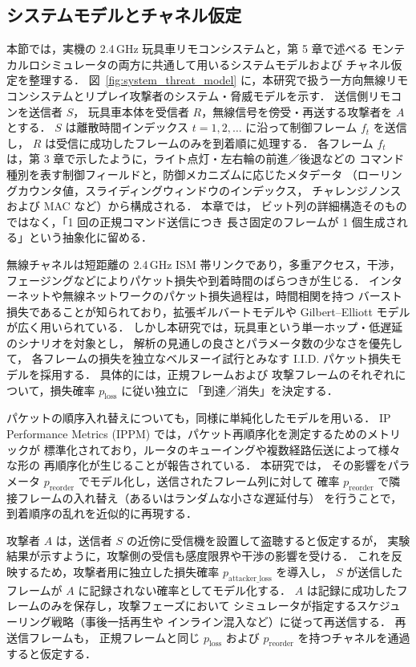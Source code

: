 \documentclass[twocolumn,10pt,a4paper]{jsarticle}
\begin{document}
\subsection{システムモデルとチャネル仮定}

本節では，実機の 2.4\,GHz 玩具車リモコンシステムと，第 5 章で述べる
モンテカルロシミュレータの両方に共通して用いるシステムモデルおよび
チャネル仮定を整理する．
図~\ref{fig:system_threat_model} に，本研究で扱う一方向無線リモコンシステムとリプレイ攻撃者のシステム・脅威モデルを示す．
送信側リモコンを送信者 $S$，
玩具車本体を受信者 $R$，無線信号を傍受・再送する攻撃者を $A$ とする．
$S$ は離散時間インデックス $t = 1,2,\ldots$ に沿って制御フレーム $f_t$ を送信し，
$R$ は受信に成功したフレームのみを到着順に処理する．
各フレーム $f_t$ は，第 3 章で示したように，ライト点灯・左右輪の前進／後退などの
コマンド種別を表す制御フィールドと，防御メカニズムに応じたメタデータ
（ローリングカウンタ値，スライディングウィンドウのインデックス，
チャレンジノンスおよび MAC など）から構成される．
本章では，
ビット列の詳細構造そのものではなく，「1 回の正規コマンド送信につき
長さ固定のフレームが 1 個生成される」という抽象化に留める．

無線チャネルは短距離の 2.4\,GHz ISM 帯リンクであり，多重アクセス，干渉，
フェージングなどによりパケット損失や到着時間のばらつきが生じる．
インターネットや無線ネットワークのパケット損失過程は，時間相関を持つ
バースト損失であることが知られており，拡張ギルバートモデルや
Gilbert--Elliott モデルが広く用いられている\cite{Jiang2000Modeling,Hasslinger2008GE}．
しかし本研究では，玩具車という単一ホップ・低遅延のシナリオを対象とし，
解析の見通しの良さとパラメータ数の少なさを優先して，
各フレームの損失を独立なベルヌーイ試行とみなす
I.I.D. パケット損失モデルを採用する．
具体的には，正規フレームおよび
攻撃フレームのそれぞれについて，損失確率 $p_{\mathrm{loss}}$ に従い独立に
「到達／消失」を決定する．

パケットの順序入れ替えについても，同様に単純化したモデルを用いる．
IP Performance Metrics (IPPM) では，パケット再順序化を測定するためのメトリックが
標準化されており，ルータのキューイングや複数経路伝送によって様々な形の
再順序化が生じることが報告されている\cite{rfc4737}．
本研究では，
その影響をパラメータ $p_{\mathrm{reorder}}$ でモデル化し，送信されたフレーム列に対して
確率 $p_{\mathrm{reorder}}$ で隣接フレームの入れ替え（あるいはランダムな小さな遅延付与）
を行うことで，到着順序の乱れを近似的に再現する．

攻撃者 $A$ は，送信者 $S$ の近傍に受信機を設置して盗聴すると仮定するが，
実験結果が示すように，攻撃側の受信も感度限界や干渉の影響を受ける．
これを反映するため，攻撃者用に独立した損失確率 $p_{\mathrm{attacker\_loss}}$ を導入し，
$S$ が送信したフレームが $A$ に記録されない確率としてモデル化する．
$A$ は記録に成功したフレームのみを保存し，攻撃フェーズにおいて
シミュレータが指定するスケジューリング戦略（事後一括再生や
インライン混入など）に従って再送信する．
再送信フレームも，
正規フレームと同じ $p_{\mathrm{loss}}$ および $p_{\mathrm{reorder}}$ を持つチャネルを通過すると仮定する．
\end{document}

